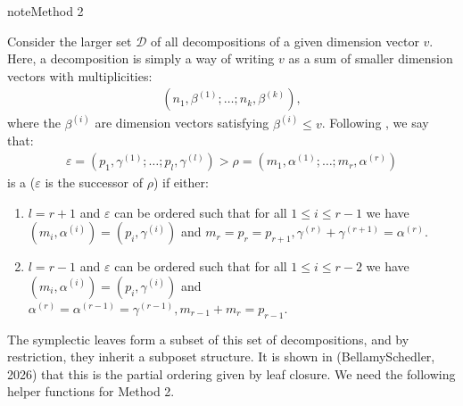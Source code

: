 \documentclass[letterpaper,10pt,english]{sphinxmanual}
\begin{document}
\begin{sphinxadmonition}{note}{Method 2}

\sphinxAtStartPar
Consider the larger set \(\mathcal{D}\) of all decompositions of a given dimension vector \(v\). Here, a decomposition is simply a way of writing \(v\) as a sum of smaller dimension vectors with multiplicities:
\begin{equation*}
\begin{split}\left(n_1,\beta^{(1)};\dots;n_k,\beta^{(k)}\right),\end{split}
\end{equation*}
\sphinxAtStartPar
where the \(\beta^{(i)}\) are dimension vectors satisfying \(\beta^{(i)}\leq v\). Following , we say that:
\begin{equation*}
\begin{split}\varepsilon=(p_1,\gamma^{(1)};\dots;p_l,\gamma^{(l)})>\rho=(m_1,\alpha^{(1)};\dots;m_r,\alpha^{(r)})\end{split}
\end{equation*}
\sphinxAtStartPar
is a  (\(\varepsilon\) is the successor of \(\rho\)) if either:
\begin{enumerate}
%
\item {} 
\sphinxAtStartPar
\(l=r+1\) and \(\varepsilon\) can be ordered such that for all \(1\leq i\leq r-1\) we have \((m_i,\alpha^{(i)})=(p_i,\gamma^{(i)})\) and \(m_r=p_r=p_{r+1},\gamma^{(r)}+\gamma^{(r+1)}=\alpha^{(r)}\).

\item {} 
\sphinxAtStartPar
\(l=r-1\) and \(\varepsilon\) can be ordered such that for all \(1\leq i\leq r-2\) we have \((m_i,\alpha^{(i)})=(p_i,\gamma^{(i)})\) and \(\alpha^{(r)}=\alpha^{(r-1)}=\gamma^{(r-1)},m_{r-1}+m_r=p_{r-1}\).

\end{enumerate}
\end{sphinxadmonition}

\sphinxAtStartPar
The symplectic leaves form a subset of this set of decompositions, and by restriction, they inherit a sub\sphinxhyphen{}poset structure. It is shown in (Bellamy\sphinxhyphen{}Schedler, 2026) that this is the partial ordering given by leaf closure. We need the following helper functions for Method 2.
\end{document}
